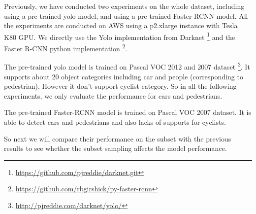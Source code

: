 Previously, we have conducted two experiments on the whole dataset,
including using a pre-trained yolo model,
and using a pre-trained Faster-RCNN model. All the experiments are conducted on AWS using a p2.xlarge instance with Tesla K80 GPU. We directly use the Yolo implementation from Darknet \footnote{\url{https://github.com/pjreddie/darknet.git}} and the Faster R-CNN python implementation \footnote{\url{https://github.com/rbgirshick/py-faster-rcnn}}.

The pre-trained yolo model is trained on Pascal VOC 2012 and 2007 dataset \footnote{\url{http://pjreddie.com/darknet/yolo/}}. It supports about 20 object categories including car and people (corresponding to pedestrian). However it don't support cyclist category. So in all the following experiments, we only evaluate the performance for cars and pedestrians.

The pre-trained Faster-RCNN model is trained on Pascal VOC 2007 dataset. It is able to detect cars and pedestrians and also lacks of supports for cyclists.

So next we will compare their performance on the subset with the 
previous results to see whether the subset sampling affects the 
model performance.


